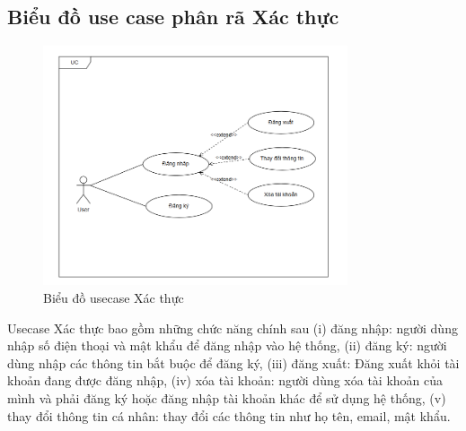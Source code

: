 \documentclass[../DoAn.tex]{subfiles}
\begin{document}
\subsection{Biểu đồ use case phân rã Xác thực}
\label{subsection:2.2.2}
\begin{figure}[H]
  \centering
  \includegraphics[width=0.8\textwidth]{Hinhve/Usecase_xac_thuc.png}
  \caption{Biểu đồ usecase Xác thực}
  \label{fig:use_case_xac_thuc}
\end{figure}
Usecase Xác thực bao gồm những chức năng chính sau (i) đăng nhập: người dùng nhập số điện thoại và mật khẩu để đăng nhập vào hệ thống, (ii) đăng ký: người dùng nhập các thông tin bắt buộc để đăng ký, (iii) đăng xuất: Đăng xuất khỏi tài khoản đang được đăng nhập, (iv) xóa tài khoản: người dùng xóa tài khoản của mình và phải đăng ký hoặc đăng nhập tài khoản khác để sử dụng hệ thống, (v) thay đổi thông tin cá nhân: thay đổi các thông tin như họ tên, email, mật khẩu.
\end{document}
